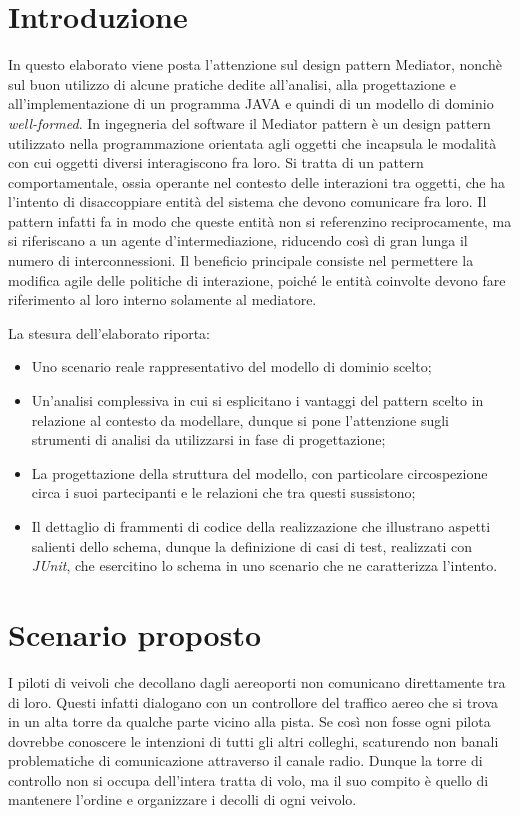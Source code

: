 \documentclass{article}
\begin{document}
\begin{sloppy}
    

\section{Introduzione}
In questo elaborato viene posta l'attenzione sul design pattern Mediator, nonchè sul buon utilizzo di alcune pratiche dedite all'analisi, alla progettazione e 
all'implementazione di un programma JAVA e quindi di un modello di dominio \textit{well-formed}.
\bigbreak
In ingegneria del software il Mediator pattern è un design pattern utilizzato nella programmazione orientata agli oggetti che incapsula le modalità con cui oggetti diversi interagiscono fra loro.
Si tratta di un pattern comportamentale, ossia operante nel contesto delle interazioni tra oggetti, che ha l'intento di disaccoppiare entità del sistema che devono comunicare fra loro. Il pattern infatti fa in modo che queste entità non si referenzino reciprocamente, ma si riferiscano a un agente d'intermediazione, riducendo così di gran lunga il numero di interconnessioni.
Il beneficio principale consiste nel permettere la modifica agile delle politiche di interazione, poiché le entità coinvolte devono fare riferimento al loro interno solamente al mediatore. 

\bigbreak
La stesura dell'elaborato riporta:
\begin{itemize}
\item Uno scenario reale rappresentativo del modello di dominio scelto;
\item Un'analisi complessiva in cui si esplicitano i vantaggi del pattern scelto in relazione al contesto da modellare, dunque si pone l'attenzione sugli strumenti di analisi da utilizzarsi in fase di progettazione;
\item La progettazione della struttura del modello, con particolare circospezione circa i suoi partecipanti e le relazioni che tra questi sussistono;
\item Il dettaglio di frammenti di codice della realizzazione che illustrano aspetti salienti dello schema, dunque la definizione di casi di test, realizzati con \textit{JUnit}, che esercitino lo schema in uno scenario che ne caratterizza l’intento.
\end{itemize}

\section{Scenario proposto}
I piloti di veivoli che decollano dagli aereoporti non comunicano direttamente tra di loro. Questi infatti dialogano con un controllore del traffico aereo che si trova in un alta torre da qualche parte vicino alla pista. Se così non fosse ogni pilota dovrebbe conoscere le intenzioni di tutti gli altri colleghi, scaturendo non banali problematiche di comunicazione attraverso il canale radio. Dunque la torre di controllo non si occupa dell'intera tratta di volo, ma il suo compito è quello di mantenere l'ordine e organizzare i decolli di ogni veivolo.


\end{sloppy}
\end{document}
